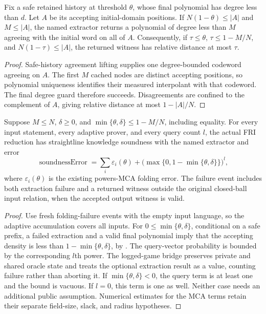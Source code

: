 \begin{theorem}\label{thm:fri-extractor-recovery}
\leanok
{}
Fix a safe retained history at threshold $\theta$, whose final polynomial has
degree less than $d$. Let $A$ be its accepting initial-domain positions. If
$N(1-\theta)\leq |A|$ and $M\leq |A|$, the named extractor returns a
polynomial of degree less than $M$ agreeing with the initial word on all of $A$.
Consequently, if $\tau\leq\theta$, $\tau\leq 1-M/N$, and
$N(1-\tau)\leq |A|$, the returned witness has relative distance at most $\tau$.
\end{theorem}
\begin{proof}
\leanok
Safe-history agreement lifting supplies one degree-bounded codeword agreeing on
$A$. The first $M$ cached nodes are distinct accepting positions, so polynomial
uniqueness identifies their measured interpolant with that codeword. The final
degree guard therefore succeeds. Disagreements are confined to the complement
of $A$, giving relative distance at most $1-|A|/N$.
\end{proof}

\begin{theorem}\label{thm:fri-knowledge-soundness}
\leanok
{}
Suppose $M\leq N$, $\delta\geq0$, and
$\min\{\theta,\delta\}\leq1-M/N$, including equality.
For every input statement, every adaptive prover, and every query count $l$, the
actual FRI reduction has straightline knowledge soundness with the named
extractor and error
\[
  \operatorname{soundnessError}
  =\sum_i\varepsilon_i(\theta)
    +\bigl(\max\{0,1-\min\{\theta,\delta\}\}\bigr)^l,
\]
where $\varepsilon_i(\theta)$ is the existing powers-MCA folding error.
The failure event includes both extraction failure and a returned witness outside
the original closed-ball input relation, when the accepted output witness is valid.
\end{theorem}
\begin{proof}
\leanok
Use fresh folding-failure events with the empty input language, so the adaptive
accumulation covers all inputs. For $0\leq\min\{\theta,\delta\}$,
conditional on a safe prefix, a failed extraction
and a valid final polynomial imply that the accepting density is less than
$1-\min\{\theta,\delta\}$, by .
The query-vector probability is bounded by the corresponding $l$th power.
The logged-game bridge preserves private and shared oracle state and treats the
optional extraction result as a value, counting failure rather than aborting it.
If $\min\{\theta,\delta\}<0$, the query term is at least one and the bound is
vacuous. If $l=0$, this term is one as well. Neither case needs an additional
public assumption. Numerical estimates for the MCA terms retain their separate
field-size, slack, and radius hypotheses.
\end{proof}

